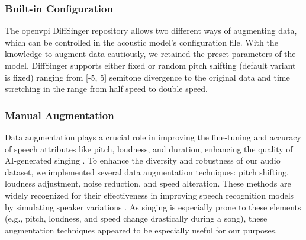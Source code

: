 \documentclass[a4paper]{article}
\begin{document}
	\subsubsection{Built-in Configuration}
	
	The openvpi DiffSinger repository allows two different ways of augmenting data, which can be controlled in the acoustic model’s configuration file. With the knowledge to augment data cautiously, we retained the preset parameters of the model. DiffSinger supports either fixed or random pitch shifting (default variant is fixed) ranging from [-5, 5] semitone divergence to the original data and time stretching in the range from half speed to double speed. \cite{openvpi-diffsinger}
	
	\subsubsection{Manual Augmentation}
	
	Data augmentation plays a crucial role in improving the fine-tuning and accuracy of speech attributes like pitch, loudness, and duration, enhancing the quality of AI-generated singing \cite{Morrison2024}.
	To enhance the diversity and robustness of our audio dataset, we implemented several data augmentation techniques: pitch shifting, loudness adjustment, noise reduction, and speed alteration. These methods are widely recognized for their effectiveness in improving speech recognition models by simulating speaker variations \cite{Morrison2024}. As singing is especially prone to these elements (e.g., pitch, loudness, and speed change drastically during a song), these augmentation techniques appeared to be especially useful for our purposes.
	
\end{document}

